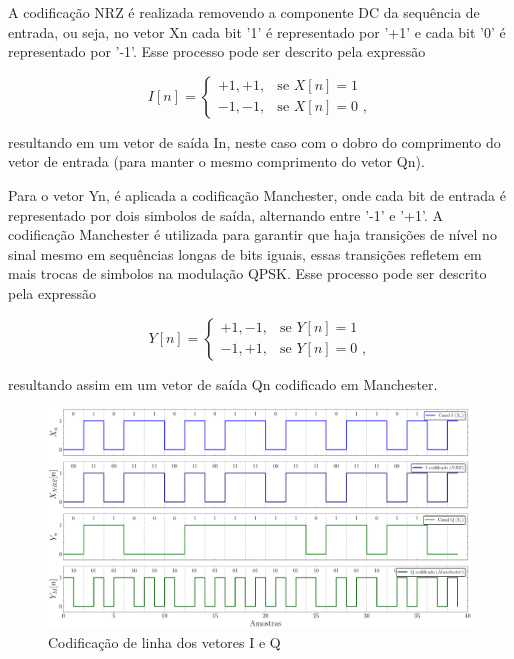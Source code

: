 A codificação \gls{NRZ} é realizada removendo a componente DC da sequência de entrada, ou seja, no vetor \gls{Xn} cada bit '1' é representado por '+1' e cada bit '0' é representado por '-1'. Esse processo pode ser descrito pela expressão

\begin{equation}
I[n] = 
\begin{cases}
+1, +1, & \text{se } X[n] = 1 \\
-1, -1, & \text{se } X[n] = 0 \text{ ,}
\end{cases}
\end{equation}

\noindent resultando em um vetor de saída \gls{In}, neste caso com o dobro do comprimento do vetor de entrada (para manter o mesmo comprimento do vetor \gls{Qn}). 

Para o vetor \gls{Yn}, é aplicada a codificação \gls{Manchester}, onde cada bit de entrada é representado por dois simbolos de saída, alternando entre '-1' e '+1'.  A codificação \gls{Manchester} é utilizada para garantir que haja transições de nível no sinal mesmo em sequências longas de bits iguais, essas transições refletem em mais trocas de simbolos na modulação \gls{QPSK}. Esse processo pode ser descrito pela expressão

\begin{equation}
Y[n] = 
\begin{cases}
+1,-1, & \text{se } Y[n] = 1 \\
-1,+1, & \text{se } Y[n] = 0 \text{ ,}
\end{cases}
\end{equation}

\noindent resultando assim em um vetor de saída \gls{Qn} codificado em Manchester.
\begin{figure}[H]
	\centering
	\caption{Codificação de linha dos vetores I e Q}\label{fig:codificacao_linha}
	\includegraphics[width=\linewidth]{assets/codificacao_linha.pdf}
\end{figure}


